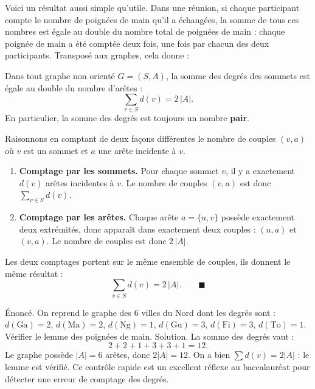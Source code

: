 \documentclass[11pt]{article}
\begin{document}
Voici un résultat aussi simple qu'utile. Dans une réunion, si chaque participant compte le nombre de poignées de main qu'il a échangées, la somme de tous ces nombres est égale au double du nombre total de poignées de main : chaque poignée de main a été comptée deux fois, une fois par chacun des deux participants. Transposé aux graphes, cela donne :

\begin{propriete}
Dans tout graphe non orienté $G = (S, A)$, la somme des degrés des sommets est égale au double du nombre d'arêtes :
\[ \sum_{v \in S} d(v) = 2\,|A|. \]
En particulier, la somme des degrés est toujours un nombre \textbf{pair}.
\end{propriete}

\begin{experience}
Raisonnons en comptant de deux façons différentes le nombre de couples $(v, a)$ où $v$ est un sommet et $a$ une arête incidente à $v$.
\begin{enumerate}
\item \textbf{Comptage par les sommets.} Pour chaque sommet $v$, il y a exactement $d(v)$ arêtes incidentes à $v$. Le nombre de couples $(v, a)$ est donc $\displaystyle\sum_{v \in S} d(v)$.
\item \textbf{Comptage par les arêtes.} Chaque arête $a = \{u, v\}$ possède exactement deux extrémités, donc apparaît dans exactement deux couples : $(u, a)$ et $(v, a)$. Le nombre de couples est donc $2\,|A|$.
\end{enumerate}
Les deux comptages portent sur le même ensemble de couples, ils donnent le même résultat :
\[ \sum_{v \in S} d(v) = 2\,|A|. \qquad \blacksquare \]
\end{experience}

\begin{exoresolu}
Énoncé. On reprend le graphe des 6 villes du Nord dont les degrés sont : $d(\text{Ga}) = 2$, $d(\text{Ma}) = 2$, $d(\text{Ng}) = 1$, $d(\text{Gu}) = 3$, $d(\text{Fi}) = 3$, $d(\text{To}) = 1$. Vérifier le lemme des poignées de main.
\tcblower
Solution. La somme des degrés vaut :
\[ 2 + 2 + 1 + 3 + 3 + 1 = 12. \]
Le graphe possède $|A| = 6$ arêtes, donc $2|A| = 12$. On a bien $\sum d(v) = 2|A|$ : le lemme est vérifié. Ce contrôle rapide est un excellent réflexe au baccalauréat pour détecter une erreur de comptage des degrés.
\end{exoresolu}
\end{document}
